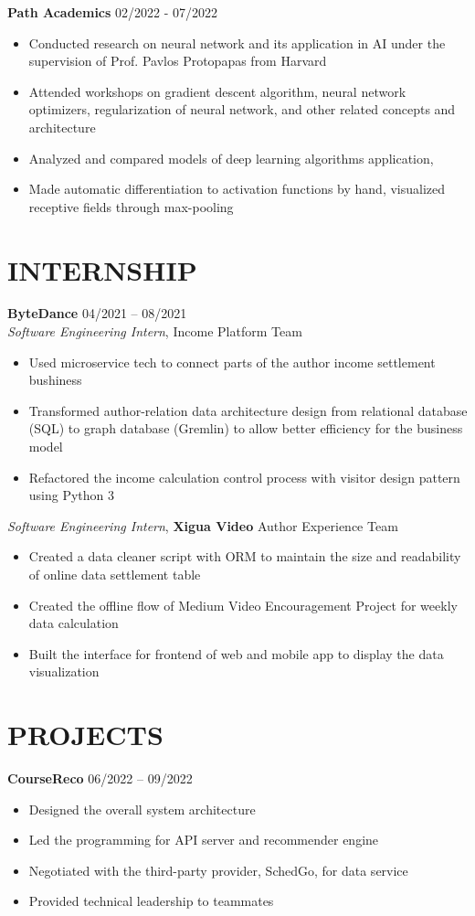 \documentclass[margin,line]{res}
\begin{document}
\begin{resume}
\textbf{Path Academics} \hfill 02/2022 - 07/2022 \\
\begin{itemize}
	\item Conducted research on neural network and its application in AI under the supervision of Prof. Pavlos Protopapas from Harvard 
	\item Attended workshops on gradient descent algorithm, neural network optimizers,
		regularization of neural network, and other related concepts and architecture 
	\item Analyzed and compared models of deep learning algorithms application, 
	\item Made automatic differentiation to activation functions by hand, visualized receptive fields through max-pooling
\end{itemize}

\section{\sc INTERNSHIP}
\textbf{ByteDance} \hfill {04/2021 -- 08/2021} \\
\textit{Software Engineering Intern}, {Income Platform Team}
\begin{itemize}
	\item Used microservice tech to connect parts of the author income settlement bushiness
	\item Transformed author-relation data architecture design from relational database (SQL) to graph database (Gremlin) to allow better efficiency for the business model
	\item Refactored the income calculation control process with visitor design pattern using Python 3
\end{itemize}

\textit{Software Engineering Intern}, {\textbf{Xigua Video} Author Experience Team}
\begin{itemize}
	\item Created a data cleaner script with ORM to maintain the size and readability of online data settlement table 
	\item Created the offline flow of Medium Video Encouragement Project for weekly data calculation
	\item Built the interface for frontend of web and mobile app to display the data visualization 
\end{itemize}

\section{\sc PROJECTS}
\textbf{CourseReco} \hfill {06/2022 -- 09/2022} \\
\begin{itemize}
	\item Designed the overall system architecture
	\item Led the programming for API server and recommender engine
	\item Negotiated with the third-party provider, SchedGo, for data service
	\item Provided technical leadership to teammates 
\end{itemize}


\end{resume}
\end{document}

